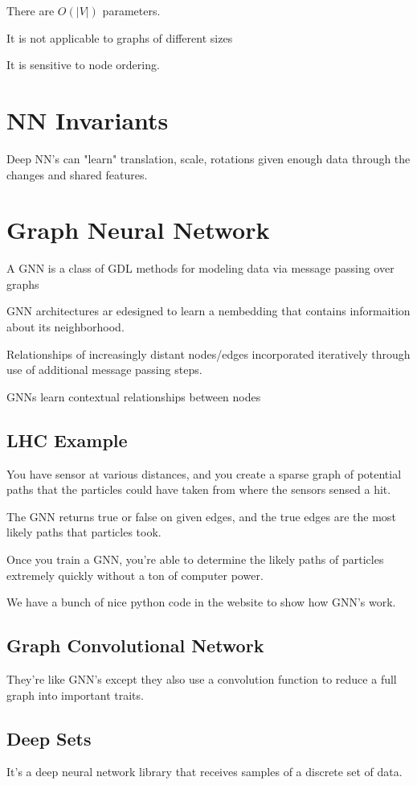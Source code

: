 \documentclass[fleqn]{report}
\begin{document}
There are $O(|V|)$ parameters.

It is not applicable to graphs of different sizes 

It is sensitive to node ordering.

\section{NN Invariants}
Deep NN's can "learn" translation, scale, rotations given enough data through 
the changes and shared features.

\section{Graph Neural Network}
A GNN is a class of GDL methods for modeling data via message passing 
over graphs 

GNN architectures ar edesigned to learn a nembedding that 
contains informaition about its neighborhood.

Relationships of increasingly distant nodes/edges incorporated iteratively 
through use of additional message passing steps. 

GNNs learn contextual relationships between nodes 

\subsection{LHC Example}
You have sensor at various distances, and you create a sparse graph 
of potential paths that the particles could have taken from where the sensors 
sensed a hit. 

The GNN returns true or false on given edges, and the true edges are the 
most likely paths that particles took. 

Once you train a GNN, you're able to determine the likely paths of particles 
extremely quickly without a ton of computer power. 

We have a bunch of nice python code in the website to 
show how GNN's work. 

\subsection{Graph Convolutional Network}
They're like GNN's except they also use a convolution function to reduce 
a full graph into important traits. 

\subsection{Deep Sets}
It's a deep neural network library that receives samples of a discrete 
set of data. 
\end{document}
